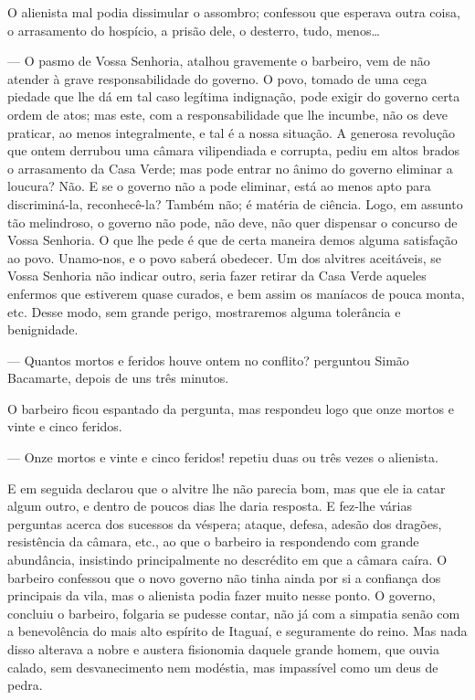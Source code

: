 O alienista mal podia dissimular o assombro; confessou que esperava
outra coisa, o arrasamento do hospício, a prisão dele, o desterro, tudo,
menos\ldots{}

--- O pasmo de Vossa Senhoria, atalhou gravemente o barbeiro, vem de não
atender à grave responsabilidade do governo. O povo, tomado de uma cega
piedade que lhe dá em tal caso legítima indignação, pode exigir do
governo certa ordem de atos; mas este, com a responsabilidade que lhe
incumbe, não os deve praticar, ao menos integralmente, e tal é a nossa
situação. A generosa revolução que ontem derrubou uma câmara
vilipendiada e corrupta, pediu em altos brados o arrasamento da Casa
Verde; mas pode entrar no ânimo do governo eliminar a loucura? Não. E se
o governo não a pode eliminar, está ao menos apto para discriminá-la,
reconhecê-la? Também não; é matéria de ciência. Logo, em assunto tão
melindroso, o governo não pode, não deve, não quer dispensar o concurso
de Vossa Senhoria. O que lhe pede é que de certa maneira demos alguma
satisfação ao povo. Unamo-nos, e o povo saberá obedecer. Um dos alvitres
aceitáveis, se Vossa Senhoria não indicar outro, seria fazer retirar da
Casa Verde aqueles enfermos que estiverem quase curados, e bem assim os
maníacos de pouca monta, etc. Desse modo, sem grande perigo, mostraremos
alguma tolerância e benignidade.

--- Quantos mortos e feridos houve ontem no conflito? perguntou Simão
Bacamarte, depois de uns três minutos.

O barbeiro ficou espantado da pergunta, mas respondeu logo que onze
mortos e vinte e cinco feridos.

--- Onze mortos e vinte e cinco feridos! repetiu duas ou três vezes o
alienista.

E em seguida declarou que o alvitre lhe não parecia bom, mas que ele ia
catar algum outro, e dentro de poucos dias lhe daria resposta. E fez-lhe
várias perguntas acerca dos sucessos da véspera; ataque, defesa, adesão
dos dragões, resistência da câmara, etc., ao que o barbeiro ia
respondendo com grande abundância, insistindo principalmente no
descrédito em que a câmara caíra. O barbeiro confessou que o novo
governo não tinha ainda por si a confiança dos principais da vila, mas o
alienista podia fazer muito nesse ponto. O governo, concluiu o barbeiro,
folgaria se pudesse contar, não já com a simpatia senão com a
benevolência do mais alto espírito de Itaguaí, e seguramente do reino.
Mas nada disso alterava a nobre e austera fisionomia daquele grande
homem, que ouvia calado, sem desvanecimento nem modéstia, mas impassível
como um deus de pedra.

